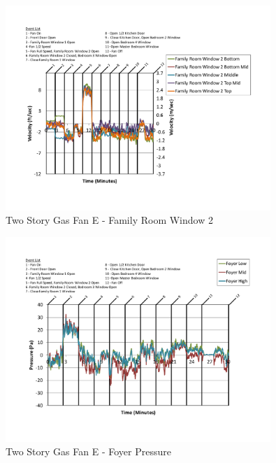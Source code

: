 \documentclass{article}
\begin{document}
\begin{appendices}
	\begin{figure}[H]
		\centering
		\includegraphics[height=3.05in,trim=0.67in 1.1in 0.67in 0.8in,clip=true]{0_Images/Results_Charts/ColdFlow/Two_Story/Gas/E/Family_Room_Window_2.pdf}
		\caption{Two Story Gas Fan E - Family Room Window 2}
	\end{figure}
 

	\begin{figure}[H]
		\centering
		\includegraphics[height=3.05in,trim=0.67in 1.1in 0.67in 0.8in,clip=true]{0_Images/Results_Charts/ColdFlow/Two_Story/Gas/E/Foyer_Pressure.pdf}
		\caption{Two Story Gas Fan E - Foyer Pressure}
	\end{figure}
 
	\clearpage


\end{appendices}
\end{document}
